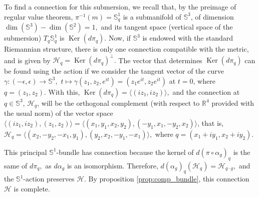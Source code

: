 \documentclass[12pt, letterpaper, reqno]{amsart}
\theoremstyle{definition}
\theoremstyle{plain}
\theoremstyle{remark}
\begin{document}
	To find a connection for this submersion, we recall that, by the preimage of regular value theorem, $ \pi^{-1}(m) = \mathbb{S}^1_q $ is a submanifold of $ \mathbb{S}^3 $, of dimension $ \operatorname{dim}( \mathbb{S}^3)- \operatorname{dim}( \mathbb{S}^2) = 1,  $ and its tangent space (vertical space of the submersion) $ T_q \mathbb{S}^1_q $ is $ \operatorname{Ker}(d\pi_q)  $. Now, if $ \mathbb{S}^3 $ is endowed with the standard Riemannian structure, there is only one connection compatible with the metric, and is given by $ \mathcal{H}_q = \operatorname{Ker}(d\pi_q)^\perp. $ The vector that determines $ \operatorname{Ker}(d\pi_q)  $ can be found using the action if we consider the tangent vector of the curve $ \gamma: (-\epsilon, \epsilon) \rightarrow \mathbb{S}^3, $ $ t\mapsto \gamma(z_1,z_2, e^{it})=(z_1e^{it},z_2e^{it}) $ at $ t=0 $, where $ q=(z_1,z_2). $ With this, $ \operatorname{Ker}(d\pi_q) = \langle(iz_1, iz_2)\rangle,  $ and the connection at $ q\in \mathbb{S}^3 $,  $ \mathcal{H}_q $, will be the orthogonal complement (with respect to $ \mathbb{R}^4 $ provided with the usual norm) of the vector space $ \langle(iz_1,iz_2), (z_1,z_2)\rangle  {= \langle(x_1,y_1,x_2,y_2), (-y_1,x_1,-y_2,x_2)\rangle}$, that is, $ \mathcal{H}_q = \langle(x_2,-y_2,-x_1,y_1),(y_2,x_2,-y_1,-x_1)\rangle, $ where $ q=(x_1+iy_1, x_2+iy_2). $   

	This principal $ \mathbb{S}^1$-bundle has connection because the kernel of $ d(\pi\circ \alpha_g)_q $ is the same of $ d\pi_q, $ as $ d\alpha_g $ is an isomorphism. Therefore, $ d(\alpha_g)_q ( \mathcal{H}_q) = \mathcal{H}_{q\cdot g}, $ and the $ \mathbb{S}^1 $-action preserves $ \mathcal{H}. $ By proposition \ref{prop:comp_bundle}, this connection $ \mathcal{H} $ is complete.  
\end{document}
